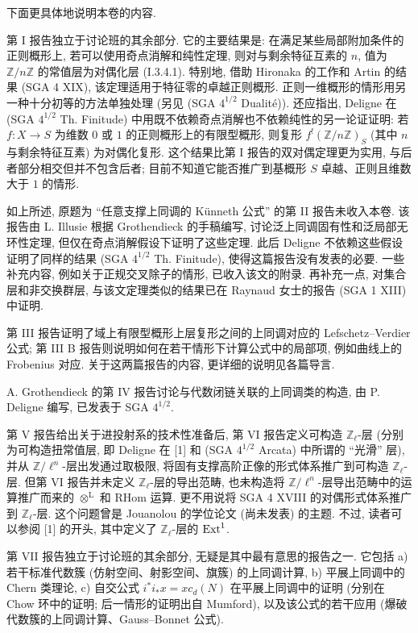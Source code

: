 下面更具体地说明本卷的内容.

第 I 报告独立于讨论班的其余部分. 它的主要结果是: 在满足某些局部附加条件的正则概形上, 若可以使用奇点消解和纯性定理, 则对与剩余特征互素的 $n$, 值为 $\mathbb Z/n\mathbb Z$ 的常值层为对偶化层 (I.3.4.1). 特别地, 借助 Hironaka 的工作和 Artin 的结果 (SGA 4 XIX), 该定理适用于特征零的卓越正则概形. 正则一维概形的情形用另一种十分初等的方法单独处理 (另见 (SGA $4^{1/2}$ Dualité)). 还应指出, Deligne 在 (SGA $4^{1/2}$ Th. Finitude) 中用既不依赖奇点消解也不依赖纯性的另一论证证明: 若 $f:X\to S$ 为维数 $0$ 或 $1$ 的正则概形上的有限型概形, 则复形 $f^!(\mathbb Z/n\mathbb Z)_S$ (其中 $n$ 与剩余特征互素) 为对偶化复形. 这个结果比第 I 报告的双对偶定理更为实用, 与后者部分相交但并不包含后者; 目前不知道它能否推广到基概形 $S$ 卓越、正则且维数大于 $1$ 的情形.

如上所述, 原题为 ``任意支撑上同调的 Künneth 公式'' 的第 II 报告未收入本卷. 该报告由 L. Illusie 根据 Grothendieck 的手稿编写, 讨论泛上同调固有性和泛局部无环性定理, 但仅在奇点消解假设下证明了这些定理. 此后 Deligne 不依赖这些假设证明了同样的结果 (SGA $4^{1/2}$ Th. Finitude), 使得这篇报告没有发表的必要. 一些补充内容, 例如关于正规交叉除子的情形, 已收入该文的附录. 再补充一点, 对集合层和非交换群层, 与该文定理类似的结果已在 Raynaud 女士的报告 (SGA 1 XIII) 中证明.

第 III 报告证明了域上有限型概形上层复形之间的上同调对应的 Lefschetz--Verdier 公式; 第 III B 报告则说明如何在若干情形下计算公式中的局部项, 例如曲线上的 Frobenius 对应. 关于这两篇报告的内容, 更详细的说明见各篇导言.

A. Grothendieck 的第 IV 报告讨论与代数闭链关联的上同调类的构造, 由 P. Deligne 编写, 已发表于 SGA $4^{1/2}$.

第 V 报告给出关于进投射系的技术性准备后, 第 VI 报告定义可构造 $\mathbb Z_\ell$-层 (分别为可构造扭常值层, 即 Deligne 在 [1] 和 (SGA $4^{1/2}$ Arcata) 中所谓的 ``光滑'' 层), 并从 $\mathbb Z/\ell^n$-层出发通过取极限, 将固有支撑高阶正像的形式体系推广到可构造 $\mathbb Z_\ell$-层. 但第 VI 报告并未定义 $\mathbb Z_\ell$-层的导出范畴, 也未构造将 $\mathbb Z/\ell^n$-层导出范畴中的运算推广而来的 $\otimes^{\mathrm L}$ 和 $\mathrm{RHom}$ 运算. 更不用说将 SGA 4 XVIII 的对偶形式体系推广到 $\mathbb Z_\ell$-层. 这个问题曾是 Jouanolou 的学位论文 (尚未发表) 的主题. 不过, 读者可以参阅 [1] 的开头, 其中定义了 $\mathbb Z_\ell$-层的 $\operatorname{Ext}^1$.

第 VII 报告独立于讨论班的其余部分, 无疑是其中最有意思的报告之一. 它包括 a) 若干标准代数簇 (仿射空间、射影空间、旗簇) 的上同调计算, b) 平展上同调中的 Chern 类理论, c) 自交公式 $i^*i_*x=x c_d(N)$ 在平展上同调中的证明 (分别在 Chow 环中的证明; 后一情形的证明出自 Mumford), 以及该公式的若干应用 (爆破代数簇的上同调计算、Gauss--Bonnet 公式).

